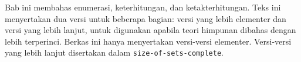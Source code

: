 \documentclass[../../../include/open-logic-chapter]{subfiles}
\begin{document}

\begin{editorial}
Bab ini membahas enumerasi, keterhitungan, dan ketakterhitungan.
Teks ini menyertakan dua versi untuk beberapa bagian: versi yang lebih
elementer dan versi yang lebih lanjut, untuk digunakan apabila teori
himpunan dibahas dengan lebih terperinci. Berkas ini hanya menyertakan
versi-versi elementer. Versi-versi yang lebih lanjut disertakan dalam
\verb|size-of-sets-complete|.
\end{editorial}











\OLEndChapterHook
\end{document}
